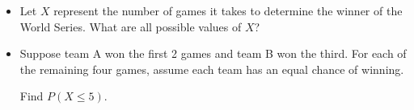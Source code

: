 \documentclass[10pt]{article}
\begin{document}
    \begin{itemize}
    \item[(a)] Let $X$ represent the number of games it takes to determine the winner of the World Series. What are all possible values of $X$?
    \vfill

    \item[(b)] Suppose team A won the first 2 games and team B won the third. For each of the remaining four games, assume each team has an equal chance of winning. 

    Find $P(X\le 5)$.

    \vfill

    \end{itemize}
\end{document}
